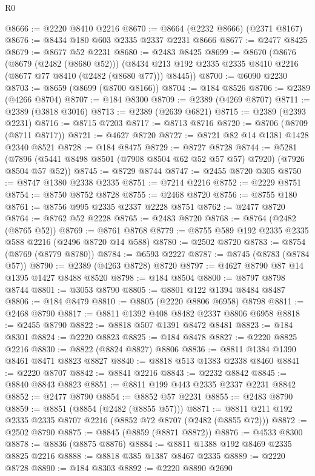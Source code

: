 \begin{lexlean}{R0}
\begin{coremodule}
@8666 := @2220 @8410 @2216
@8670 := @8664 (@2232 @8666) (@2371 @8167)
@8676 := @8434 @180 @603 @2335 @2337 @2231 @8666
@8677 := @2477 @8425
@8679 := @8677 @52 @2231
@8680 := @2483 @8425
@8699 := @8670
    (@8676
      (@8679 (@2482 (@8680 @52)))
      (@8434 @213 @192 @2335 @2335 @8410 @2216 (@8677 @77 @8410 (@2482 (@8680 @77))) @8445))
@8700 := @6090 @2230
@8703 := @8659 (@8699 (@8700 @8166))
@8704 := @184 @8526
@8706 := @2389 (@4266 @8704)
@8707 := @184 @8300
@8709 := @2389 (@4269 @8707)
@8711 := @2389 (@3818 @3016)
@8713 := @2389 (@2639 @6821)
@8715 := @2389 (@2393 @2231)
@8716 := @8715 @7203
@8717 := @8713 @8716
@8720 := @8706 (@8709 (@8711 @8717))
@8721 := @4627 @8720
@8727 := @8721 @82 @14 @1381 @1428 @2340 @8521
@8728 := @184 @8475
@8729 := @8727 @8728
@8744 := @5281 (@7896 (@5441 @8498 @8501 (@7908 @8504 @62 @52 @57 @57) @7920) (@7926 @8504 @57 @52))
@8745 := @8729 @8744
@8747 := @2455 @8720 @305
@8750 := @8747 @1380 @2338 @2335
@8751 := @7214 @2216
@8752 := @2229 @8751
@8754 := @8750 @8752 @8728
@8755 := @2468 @8720
@8756 := @8755 @180
@8761 := @8756 @995 @2335 @2337 @2228 @8751
@8762 := @2477 @8720
@8764 := @8762 @52 @2228
@8765 := @2483 @8720
@8768 := @8764 (@2482 (@8765 @52))
@8769 := @8761 @8768
@8779 := @8755 @589 @192 @2335 @2335 @588 @2216 (@2496 @8720 @14 @588)
@8780 := @2502 @8720
@8783 := @8754 (@8769 (@8779 @8780))
@8784 := @6593 @2227
@8787 := @8745 (@8783 (@8784 @57))
@8790 := @2389 (@4263 @8728) @8720
@8797 := @4627 @8790 @87 @14 @1395 @1427 @8488 @8520
@8798 := @184 @8504
@8800 := @8797 @8798 @8744
@8801 := @3053 @8790
@8805 := @8801 @122 @1394 @8484 @8487
@8806 := @184 @8479
@8810 := @8805 (@2220 @8806 @6958) @8798
@8811 := @2468 @8790
@8817 := @8811 @1392 @408 @8482 @2337 @8806 @6958
@8818 := @2455 @8790
@8822 := @8818 @507 @1391 @8472 @8481
@8823 := @184 @8301
@8824 := @2220 @8823
@8825 := @184 @8478
@8827 := @2220 @8825 @2216
@8830 := @8822 (@8824 @8827) @8806
@8836 := @8811 @1384 @1390 @8461 @8471 @8823 @8827
@8840 := @8818 @513 @1383 @2338 @8460
@8841 := @2220 @8707
@8842 := @8841 @2216
@8843 := @2232 @8842
@8845 := @8840 @8843 @8823
@8851 := @8811 @199 @443 @2335 @2337 @2231 @8842
@8852 := @2477 @8790
@8854 := @8852 @57 @2231
@8855 := @2483 @8790
@8859 := @8851 (@8854 (@2482 (@8855 @57)))
@8871 := @8811 @211 @192 @2335 @2335 @8707 @2216 (@8852 @72 @8707 (@2482 (@8855 @72)))
@8872 := @2502 @8790
@8875 := @8845 (@8859 (@8871 @8872))
@8876 := @4533 @8300
@8878 := @8836 (@8875 @8876)
@8884 := @8811 @1388 @192 @8469 @2335 @8825 @2216
@8888 := @8818 @385 @1387 @8467 @2335
@8889 := @2220 @8728
@8890 := @184 @8303
@8892 := @2220 @8890 @2690

\end{coremodule}
\end{lexlean}
